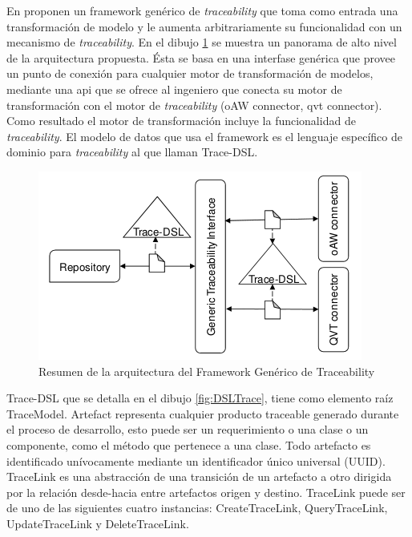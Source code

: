 \documentclass[a4paper,12pt,oneside,spanish]{book}
\begin{document}
En \cite{GrammelKastenholz} proponen un framework genérico de \textit{traceability} que toma como entrada una transformación de modelo y le aumenta arbitrariamente su funcionalidad con un mecanismo de \textit{traceability}. En el dibujo \ref{fig:GenericoArquitectura} se muestra un panorama de alto nivel de la arquitectura propuesta. Ésta se basa en una interfase genérica que provee un punto de conexión para cualquier motor de transformación de modelos, mediante una \gls{api} que se ofrece al ingeniero que conecta su motor de transformación con el motor de \textit{traceability} (oAW connector, \gls{qvt} connector). Como resultado el motor de transformación incluye la funcionalidad de \textit{traceability}. El modelo de datos que usa el framework es el lenguaje específico de dominio para \textit{traceability} al que llaman Trace-DSL.

\begin{figure}[hbtp]
\centering
\includegraphics[scale=.7]{./img/GenericTraceFrame_Arquitectura}
\caption{Resumen de la arquitectura del Framework Genérico de Traceability}
\label{fig:GenericoArquitectura}
\end{figure}


Trace-DSL que se detalla en el dibujo \ref{fig:DSLTrace}, tiene como elemento raíz TraceModel. Artefact representa cualquier producto traceable generado durante el proceso de desarrollo, esto puede ser un requerimiento o una clase o un componente, como el método que pertenece a una clase. Todo artefacto es identificado unívocamente mediante un identificador único universal (UUID). TraceLink es una abstracción de una transición de un artefacto a otro dirigida por la relación desde-hacia entre artefactos origen y destino. TraceLink puede ser de uno de las siguientes cuatro instancias: CreateTraceLink, QueryTraceLink, UpdateTraceLink y DeleteTraceLink.
\end{document}
